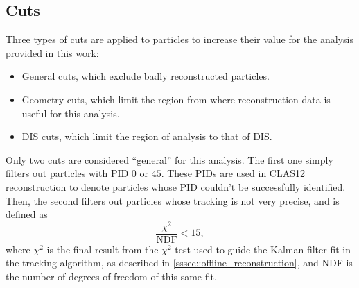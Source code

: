 \subsection{Cuts} \label{ssec::cuts}
    Three types of cuts are applied to particles to increase their value for the analysis provided in this work:
    \begin{itemize}
        \item
            General cuts, which exclude badly reconstructed particles.
        \item
            Geometry cuts, which limit the region from where reconstruction data is useful for this analysis.
        \item
            DIS cuts, which limit the region of analysis to that of DIS.
    \end{itemize}

    Only two cuts are considered ``general'' for this analysis.
    The first one simply filters out particles with PID $0$ or $45$.
    These PIDs are used in CLAS12 reconstruction to denote particles whose PID couldn't be successfully identified.
    Then, the second filters out particles whose tracking is not very precise, and is defined as
    \begin{equation*}
        \frac{\chi^2}{\text{NDF}} < 15,
    \end{equation*}
    where $\chi^2$ is the final result from the $\chi^2$-test used to guide the Kalman filter fit in the tracking algorithm, as described in \ref{sssec::offline_reconstruction}, and NDF is the number of degrees of freedom of this same fit.

